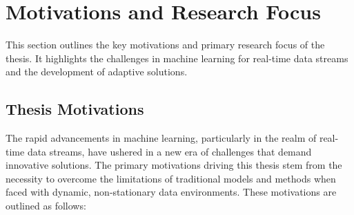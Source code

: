 \section{Motivations and Research Focus}
This section outlines the key motivations and primary research focus of the thesis. It highlights the challenges in machine learning for real-time data streams and the development of adaptive solutions.
\label{sec:1_introduction_motivation}

\subsection{Thesis Motivations}

The rapid advancements in machine learning, particularly in the realm of real-time data streams, have ushered in a new era of challenges that demand innovative solutions. The primary motivations driving this thesis stem from the necessity to overcome the limitations of traditional models and methods when faced with dynamic, non-stationary data environments. These motivations are outlined as follows:
